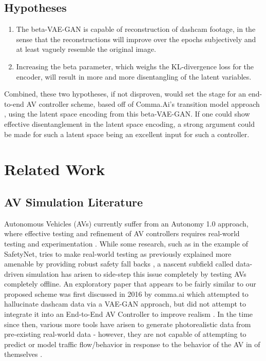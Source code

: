\documentclass{article}
\begin{document}
 \subsection{Hypotheses}
 \begin{enumerate}
     \item The beta-VAE-GAN is capable of reconstruction of dashcam footage, in the sense that the reconstructions will improve over the epochs subjectively and at least vaguely resemble the original image. 
    \item Increasing the beta parameter, which weighs the KL-divergence loss for the encoder, will result in more and more disentangling of the latent variables.
\end{enumerate}
Combined, these two hypotheses, if not disproven, would set the stage for an end-to-end AV controller scheme, based off of Comma.Ai's transition model approach \cite{santana2016learning}, using the latent space encoding from this beta-VAE-GAN. If one could show effective disentanglement in the latent space encoding, a strong argument could be made for such a latent space being an excellent input for such a controller.
\section{Related Work}
\subsection{AV Simulation Literature}
Autonomous Vehicles (AVs) currently suffer from an Autonomy 1.0 approach, where effective testing and refinement of AV controllers requires real-world testing and experimentation \cite{jain2021autonomy}. While some research, such as in the example of SafetyNet, tries to make real-world testing as previously explained more amenable by providing robust safety fall backs \cite{vitelli2022safetynet}, a nascent subfield called data-driven simulation has arisen to side-step this issue completely by testing AVs completely offline. An exploratory paper that appears to be fairly similar to our proposed scheme was first discussed in 2016 by comma.ai which attempted to hallucinate dashcam data via a VAE-GAN approach, but did not attempt to integrate it into an End-to-End AV Controller to improve realism \cite{santana2016learning}. In the time since then, various more tools have arisen to generate photorealistic data from pre-existing real-world data - however, they are not capable of attempting to predict or model traffic flow/behavior in response to the behavior of the AV in of themselves \cite{li2019aads} \cite{amini2022vista}.
\end{document}
